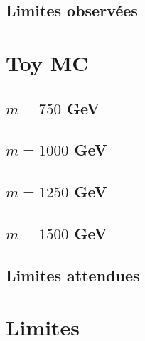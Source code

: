 \documentclass[twoside,12pt]{article}
\begin{document}
\subsection{Limites observées}


\section{Toy MC}


\subsection{$m = 750$ GeV}


\subsection{$m = 1000$ GeV}


\subsection{$m = 1250$ GeV}


\subsection{$m = 1500$ GeV}


\subsection{Limites attendues}


\section{Limites}

\end{document}
